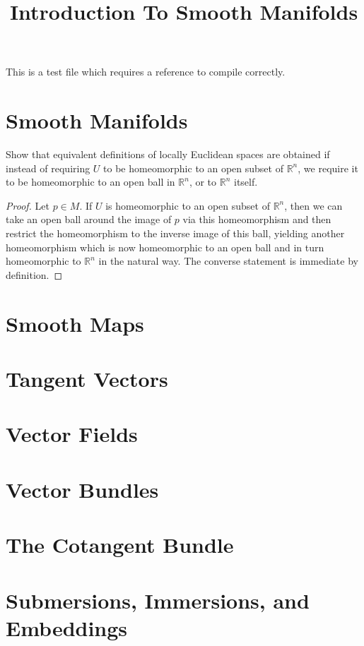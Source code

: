 


%


\title{Introduction To Smooth Manifolds}


\maketitle

\label{section-phantom}

\tableofcontents

This is a test file which requires a reference to compile correctly. \cite{Maclane}

\section{Smooth Manifolds}
\label{section-smooth-manifolds}

\begin{exercise}
\label{sm-exercise-1-1}
Show that equivalent definitions of locally Euclidean spaces are obtained if
instead of requiring $U$ to be homeomorphic to an open subset of $\mathbb R^n$,
we require it to be homeomorphic to an open ball in $\mathbb R^n$, or to
$\mathbb R^n$ itself.
\end{exercise}

\begin{proof}
Let $p \in M$. If $U$ is homeomorphic to an open subset of $\mathbb R^n$, then
we can take an open ball around the image of $p$ via this homeomorphism and
then restrict the homeomorphism to the inverse image of this ball, yielding
another homeomorphism which is now homeomorphic to an open ball and in turn
homeomorphic to $\mathbb R^n$ in the natural way. The converse statement is
immediate by definition.
\end{proof}

\section{Smooth Maps}
\label{section-smooth-maps}

\section{Tangent Vectors}
\label{section-tangent-vectors}

\section{Vector Fields}
\label{section-vector-fields}

\section{Vector Bundles}
\label{section-vector-bundles}

\section{The Cotangent Bundle}
\label{section-cotangent-bundle}

\section{Submersions, Immersions, and Embeddings}
\label{section-submersions-immersions-embeddings}








